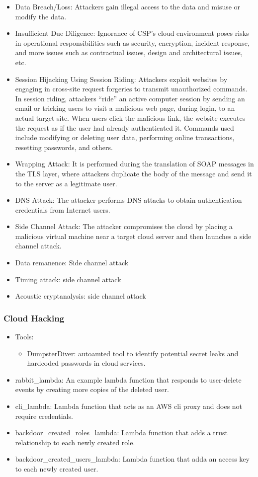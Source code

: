 \begin{itemize}
    \item Data Breach/Loss: Attackers gain illegal access to the data and misuse or modify the data.
    \item Insufficient Due Diligence: Ignorance of CSP’s cloud environment poses risks in operational responsibilities such as security, encryption, incident response, and more issues such as contractual issues, design and architectural issues, etc.
    \item Session Hijacking Using Session Riding: Attackers exploit websites by engaging in cross-site request forgeries to transmit unauthorized commands. In session riding, attackers “ride” an active computer session by sending an email or tricking users to visit a malicious web page, during login, to an actual target site. When users click the malicious link, the website executes the request as if the user had already authenticated it. Commands used include modifying or deleting user data, performing online transactions, resetting passwords, and others.
    \item Wrapping Attack: It is performed during the translation of SOAP messages in the TLS layer, where attackers duplicate the body of the message and send it to the server as a legitimate user.
    \item DNS Attack: The attacker performs DNS attacks to obtain authentication credentials from Internet users.
    \item  Side Channel Attack: The attacker compromises the cloud by placing a malicious virtual machine near a target cloud server and then launches a side channel attack.
    \item Data remanence: Side channel attack
    \item Timing attack: side channel attack
    \item Acoustic cryptanalysis: side channel attack
\end{itemize}
\subsubsection{Cloud Hacking}
\begin{itemize}
    \item Tools:
    \begin{itemize}
        \item DumpsterDiver: autoamted tool to identify potential secret leaks and hardcoded passwords in cloud services.
    \end{itemize}
    \item rabbit\_lambda: An example lambda function that responds to user-delete events by creating more copies of the deleted user.
    \item cli\_lambda: Lambda function that acts as an AWS cli proxy and does not require credentials.
    \item backdoor\_created\_roles\_lambda: Lambda function that adds a trust relationship to each newly created role.
    \item backdoor\_created\_users\_lambda: Lambda function that adda an access key to each newly created user.
\end{itemize}
